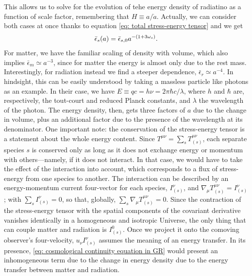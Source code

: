 This allows us to solve for the evolution of tehe energy density of radiatino as a function of scale factor, remembering that $H \equiv a/\dot{a}$. Actually, we can consider both cases at once thanks to equation \eqref{eq: total stress-energy tensor} and we get 
\begin{equation}
    \bar{\epsilon}_s(a) = \bar{\epsilon}_{s,0}a^{-(1 + 3\omega_s)}.
\end{equation}
For matter, we have the familiar scaling of density with volume, which also implies $\bar{\epsilon}_m \simeq a^{-3}$, since for matter the energy is almost only due to the rest mass. Interestingly, for radiation instead we find a steeper dependence, $\bar{\epsilon}_r \simeq a^{-4}$. In hindsight, this can be easily understood by taking a massless particle like photons as an example. In their case, we have $E \equiv q c = h \nu = 2 \pi \hbar c / \lambda$, where $h$ and $\hbar$ are, respectively, the tout-court and reduced Planck constants, and $\lambda$ the wavelength of the photon. The energy density, then, gets three factors of $a$ due to the change in volume, plus an additional factor due to the presence of the wavelength at its denominator. One important note: the conservation of the stress-energy tensor is a statement about the whole energy content. Since $T^{\mu\nu} = \sum_s T_{(s)}^{\mu\nu}$, each separate species $s$ is conserved only as long as it does not exchange energy or momentum with others—namely, if it does not interact. In that case, we would have to take the effect of the interaction into account, which corresponds to a flux of stress-energy from one species to another. The interaction can be described by an energy-momentum current four-vector for each species, $I_{(s)}^\nu$, and $\nabla_\mu T_{(s)}^{\mu\nu} = I_{(s)}^\nu$; with $\sum_s I_{(s)}^\nu = 0$, so that, globally, $\sum_s \nabla_\mu T_{(s)}^{\mu\nu} = 0$. Since the contraction of the stress-energy tensor with the spatial components of the covariant derivative vanishes identically in a homogeneous and isotropic Universe, the only thing that can couple matter and radiation is $I_{(s)}^0$. Once we project it onto the comoving observer's four-velocity, $u_\nu I_{(s)}^\nu$ assumes the meaning of an energy transfer. In its presence, \eqref{eq: cosmological continuity equation in GR} would present an inhomogeneous term due to the change in energy density due to the energy transfer between matter and radiation.

